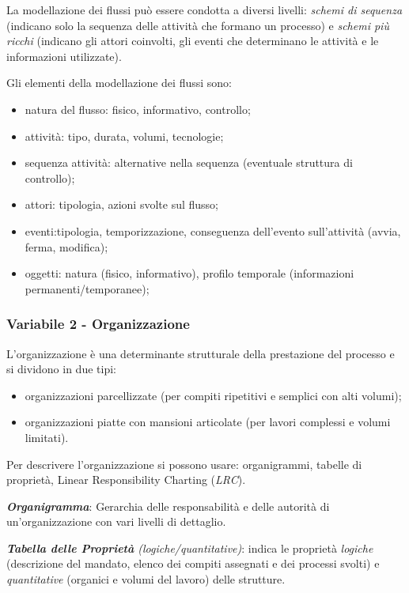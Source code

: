 \documentclass[a4paper, notitlepage, 9pt]{extreport}
\begin{document}
\noindent
La modellazione dei flussi può essere condotta a diversi livelli: \textit{schemi di sequenza} (indicano solo la sequenza delle attività che formano un processo) e \textit{schemi più ricchi} (indicano gli attori coinvolti, gli eventi che determinano le attività e le informazioni utilizzate).

\noindent
Gli elementi della modellazione dei flussi sono:
\begin{itemize}
	\item natura del flusso: fisico, informativo, controllo;
	\item attività: tipo, durata, volumi, tecnologie;
	\item sequenza attività: alternative nella sequenza (eventuale struttura di controllo);
	\item attori: tipologia, azioni svolte sul flusso;
	\item eventi:tipologia, temporizzazione, conseguenza dell'evento sull'attività (avvia, ferma, modifica);
	\item oggetti: natura (fisico, informativo), profilo temporale (informazioni permanenti/temporanee);
\end{itemize}

\subsubsection*{Variabile 2 - Organizzazione}
L’organizzazione è una determinante strutturale della prestazione del processo e si dividono in due tipi:
\begin{itemize}
	\item organizzazioni parcellizzate (per compiti ripetitivi e semplici con alti volumi);
	\item organizzazioni piatte con mansioni articolate (per lavori complessi e volumi limitati).
\end{itemize}
Per descrivere l'organizzazione si possono usare: organigrammi, tabelle di proprietà, Linear Responsibility Charting (\textit{LRC}).
\newline

\noindent
\textit{\textbf{Organigramma}}: Gerarchia delle responsabilità e delle autorità di un'organizzazione con vari livelli di dettaglio.

\noindent
\textit{\textbf{Tabella delle Proprietà} (logiche/quantitative)}: indica le proprietà \textit{logiche} (descrizione del mandato, elenco dei compiti assegnati e dei processi svolti) e \textit{quantitative} (organici e volumi del lavoro) delle strutture.
\end{document}
